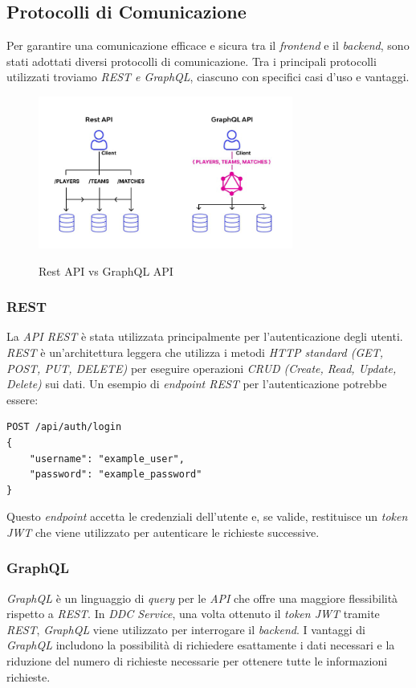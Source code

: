 \subsection{Protocolli di Comunicazione}
\label{subsec:protocolli_comunicazione}

Per garantire una comunicazione efficace e sicura tra il \textit{frontend} e il \textit{backend}, sono stati adottati diversi protocolli di comunicazione.
Tra i principali protocolli utilizzati troviamo \textit{REST e \textit{GraphQL}}, ciascuno con specifici casi d'uso e vantaggi.

\begin{figure}[H]
    \centering
    \includegraphics[alt={Rappresentazione grafica della struttura e differenza tra rest api e graphqlapi}, height=5cm]{img/restgraphql.png}
    \caption{Rest API vs GraphQL API}
    \label{fig:restapivsgraphqlapi}
\end{figure}

\subsubsection{REST}
La \textit{API REST} è stata utilizzata principalmente per l'autenticazione degli utenti.
\textit{REST} è un'architettura leggera che utilizza i metodi \textit{HTTP standard (GET, POST, PUT, DELETE)} per eseguire operazioni \textit{CRUD (Create, Read, Update, Delete)} sui dati.
Un esempio di \textit{endpoint REST} per l'autenticazione potrebbe essere:
\begin{verbatim}
POST /api/auth/login
{
    "username": "example_user",
    "password": "example_password"
}
\end{verbatim}

Questo \textit{endpoint} accetta le credenziali dell'utente e, se valide, restituisce un \textit{token JWT} che viene utilizzato per autenticare le richieste successive.

\subsubsection{GraphQL}
\textit{GraphQL} è un linguaggio di \textit{query} per le \textit{API} che offre una maggiore flessibilità rispetto a \textit{REST}.
In \textit{DDC Service}, una volta ottenuto il \textit{token JWT} tramite \textit{REST}, \textit{GraphQL} viene utilizzato per interrogare il \textit{backend}.
I vantaggi di \textit{GraphQL} includono la possibilità di richiedere esattamente i dati necessari e la riduzione del numero di richieste necessarie per ottenere tutte le informazioni richieste.

